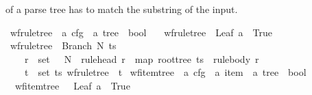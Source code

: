 \begin{isabellebody}
\begin{isamarkuptext}
\begin{itemize}
    of a parse tree has to match the substring  of the input.
\end{itemize}%
\end{isamarkuptext}\isamarkuptrue%
\isamarkupfalse%
\ wf{\isacharunderscore}{\kern0pt}rule{\isacharunderscore}{\kern0pt}tree\ {\isacharcolon}{\kern0pt}{\isacharcolon}{\kern0pt}\ {\isachardoublequoteopen}{\isacharprime}{\kern0pt}a\ cfg\ {\isasymRightarrow}\ {\isacharprime}{\kern0pt}a\ tree\ {\isasymRightarrow}\ bool{\isachardoublequoteclose}\ \isanewline
\ \ {\isachardoublequoteopen}wf{\isacharunderscore}{\kern0pt}rule{\isacharunderscore}{\kern0pt}tree\ {\isacharunderscore}{\kern0pt}\ {\isacharparenleft}{\kern0pt}Leaf\ a{\isacharparenright}{\kern0pt}\ {\isasymlongleftrightarrow}\ True{\isachardoublequoteclose}\isanewline
{\isacharbar}{\kern0pt}\ {\isachardoublequoteopen}wf{\isacharunderscore}{\kern0pt}rule{\isacharunderscore}{\kern0pt}tree\ {\isasymG}\ {\isacharparenleft}{\kern0pt}Branch\ N\ ts{\isacharparenright}{\kern0pt}\ {\isasymlongleftrightarrow}\ {\isacharparenleft}{\kern0pt}\isanewline
\ \ \ \ {\isacharparenleft}{\kern0pt}{\isasymexists}r\ {\isasymin}\ set\ {\isacharparenleft}{\kern0pt}{\isasymRR}\ {\isasymG}{\isacharparenright}{\kern0pt}{\isachardot}{\kern0pt}\ N\ {\isacharequal}{\kern0pt}\ rule{\isacharunderscore}{\kern0pt}head\ r\ {\isasymand}\ map\ root{\isacharunderscore}{\kern0pt}tree\ ts\ {\isacharequal}{\kern0pt}\ rule{\isacharunderscore}{\kern0pt}body\ r{\isacharparenright}{\kern0pt}\ {\isasymand}\isanewline
\ \ \ \ {\isacharparenleft}{\kern0pt}{\isasymforall}t\ {\isasymin}\ set\ ts{\isachardot}{\kern0pt}\ wf{\isacharunderscore}{\kern0pt}rule{\isacharunderscore}{\kern0pt}tree\ {\isasymG}\ t{\isacharparenright}{\kern0pt}{\isacharparenright}{\kern0pt}{\isachardoublequoteclose}\isanewline
\isanewline
{}\isamarkupfalse%
\ wf{\isacharunderscore}{\kern0pt}item{\isacharunderscore}{\kern0pt}tree\ {\isacharcolon}{\kern0pt}{\isacharcolon}{\kern0pt}\ {\isachardoublequoteopen}{\isacharprime}{\kern0pt}a\ cfg\ {\isasymRightarrow}\ {\isacharprime}{\kern0pt}a\ item\ {\isasymRightarrow}\ {\isacharprime}{\kern0pt}a\ tree\ {\isasymRightarrow}\ bool{\isachardoublequoteclose}\ \isanewline
\ \ {\isachardoublequoteopen}wf{\isacharunderscore}{\kern0pt}item{\isacharunderscore}{\kern0pt}tree\ {\isasymG}\ {\isacharunderscore}{\kern0pt}\ {\isacharparenleft}{\kern0pt}Leaf\ a{\isacharparenright}{\kern0pt}\ {\isasymlongleftrightarrow}\ True{\isachardoublequoteclose}\isanewline

\end{isabellebody}
